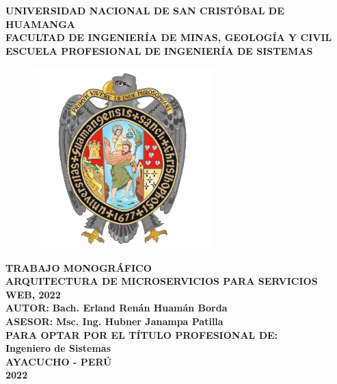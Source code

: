 \begin{titlepage}

\centering
  { \fontsize{14pt}{\baselineskip}\selectfont \textbf{UNIVERSIDAD NACIONAL DE SAN CRISTÓBAL DE HUAMANGA} }\\[0.25cm]
  { \fontsize{14pt}{\baselineskip}\selectfont \textbf{FACULTAD DE INGENIERÍA DE MINAS, GEOLOGÍA Y CIVIL} }\\[0.25cm]
  { \fontsize{14pt}{\baselineskip}\selectfont \textbf{ESCUELA PROFESIONAL DE INGENIERÍA DE SISTEMAS} }\\[0.25cm]

  \begin{figure}[htb]
    \centering
    \includegraphics[height=7cm]{src/assets/unsch_logo.jpg}
  \end{figure}

\vspace{0.5cm}
{\fontsize{12pt}{ \baselineskip}\selectfont \textbf{
  TRABAJO MONOGRÁFICO
}}\\[0.25cm]
{\fontsize{12pt}{ \baselineskip}\selectfont \textbf{
  ARQUITECTURA DE MICROSERVICIOS PARA SERVICIOS WEB, 2022
}}\\[0.5cm]
{\fontsize{12pt}{ \baselineskip}\selectfont \textbf{AUTOR:}}
{\fontsize{12pt}{ \baselineskip}\selectfont \textbf{Bach. Erland Renán Huamán Borda}}\\[0.7cm]
{\fontsize{12pt}{ \baselineskip}\selectfont \textbf{ASESOR:}}
{\fontsize{12pt}{ \baselineskip}\selectfont \textbf{Msc. Ing. Hubner Janampa Patilla}}\\[0.7cm]
{\fontsize{12pt}{ \baselineskip}\selectfont \textbf{PARA OPTAR POR EL TÍTULO PROFESIONAL DE:}}\\[0.7cm]
{\fontsize{12pt}{ \baselineskip}\selectfont \textbf{Ingeniero de Sistemas}}\\[0.8cm]

{\fontsize{12pt}{ \baselineskip}\selectfont \textbf{AYACUCHO - PERÚ}}\\[0.5cm]
{\fontsize{12pt}{ \baselineskip}\selectfont \textbf{2022}}
\singlespacing

\end{titlepage}
\restoregeometry
